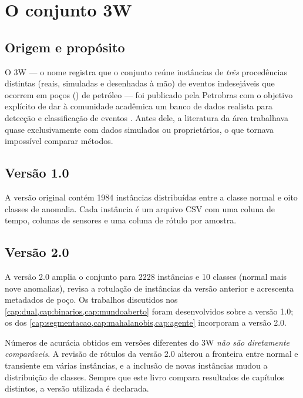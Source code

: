 \section{O conjunto 3W}

\subsection{Origem e propósito}

O 3W --- o nome registra que o conjunto reúne instâncias de \emph{três} procedências
distintas (reais, simuladas e desenhadas à mão) de eventos indesejáveis que ocorrem em
poços () de petróleo \citep{Petrobras3W} --- foi publicado pela Petrobras
com o objetivo explícito de dar à comunidade acadêmica um banco de dados realista para
detecção e classificação de eventos \citep{VARGAS2019}. Antes dele, a literatura da
área trabalhava quase exclusivamente com dados simulados ou proprietários, o que
tornava impossível comparar métodos.

\subsection{Versão 1.0}

A versão original contém \num{1984} instâncias distribuídas entre a classe normal e
oito classes de anomalia. Cada instância é um arquivo CSV com uma coluna de tempo,
colunas de sensores e uma coluna de rótulo por amostra.

\subsection{Versão 2.0}

A versão 2.0 \citep{VazVargas2026_3w2} amplia o conjunto para \num{2228} instâncias e
\num{10} classes (normal mais nove anomalias), revisa a rotulação de instâncias da
versão anterior e acrescenta metadados de poço. Os trabalhos discutidos nos
\cref{cap:dual,cap:binarios,cap:mundoaberto} foram desenvolvidos sobre a versão 1.0; os
dos \cref{cap:segmentacao,cap:mahalanobis,cap:agente} incorporam a versão 2.0.

\begin{destaque}
Números de acurácia obtidos em versões diferentes do 3W \emph{não são diretamente
comparáveis}. A revisão de rótulos da versão 2.0 alterou a fronteira entre normal e
transiente em várias instâncias, e a inclusão de novas instâncias mudou a distribuição
de classes. Sempre que este livro compara resultados de capítulos distintos, a versão
utilizada é declarada.
\end{destaque}

